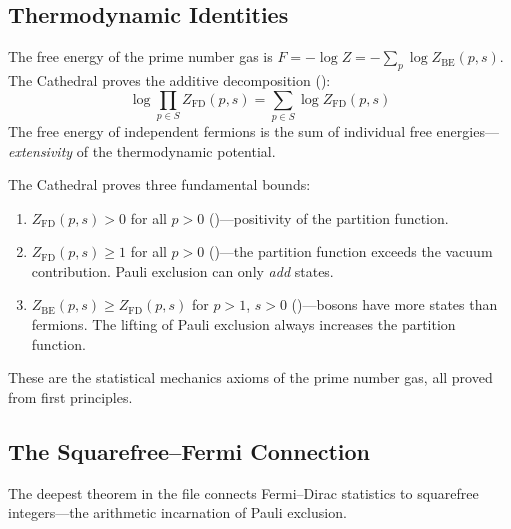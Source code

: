 \subsection{Thermodynamic Identities}

The free energy of the prime number gas is
$F = -\log Z = -\sum_p \log Z_{\mathrm{BE}}(p, s)$. The Cathedral
proves the additive decomposition ():
\begin{equation}
  \log \prod_{p \in S} Z_{\mathrm{FD}}(p, s)
  = \sum_{p \in S} \log Z_{\mathrm{FD}}(p, s)
\end{equation}
The free energy of independent fermions is the sum of individual free
energies---\emph{extensivity} of the thermodynamic potential.

\begin{principle}
The Cathedral proves three fundamental bounds:
\begin{enumerate}
  \item $Z_{\mathrm{FD}}(p, s) > 0$ for all $p > 0$
    ()---positivity of the partition function.
  \item $Z_{\mathrm{FD}}(p, s) \geq 1$ for all $p > 0$
    ()---the partition function exceeds the
    vacuum contribution. Pauli exclusion can only \emph{add} states.
  \item $Z_{\mathrm{BE}}(p, s) \geq Z_{\mathrm{FD}}(p, s)$ for $p > 1$,
    $s > 0$ ()---bosons have more states
    than fermions. The lifting of Pauli exclusion always increases the
    partition function.
\end{enumerate}
These are the statistical mechanics axioms of the prime number gas,
all proved from first principles.
\end{principle}

\subsection{The Squarefree--Fermi Connection}

The deepest theorem in the file connects Fermi--Dirac statistics to
squarefree integers---the arithmetic incarnation of Pauli exclusion.

